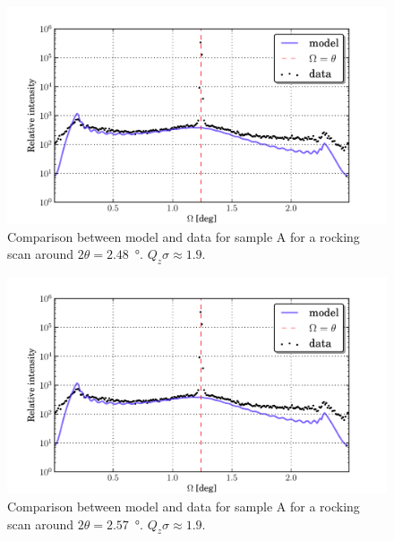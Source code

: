 \documentclass[10pt,twoside, b5paper,pdftex]{report}
\begin{document}
\begin{figure}[htbp]
	\begin{center}
		\includegraphics[width=1.0\textwidth]{figures/74_just_00320.pdf}
	\end{center}
	\caption{Comparison between model and data for  sample A for a rocking scan around $2\theta = 2.48$~\si{\degree}. $Q_z\sigma \approx 1.9$. \label{fig:just_00320}}
\end{figure}
\begin{figure}[htbp]
	\begin{center}
		\includegraphics[width=1.0\textwidth]{figures/74_just_00320.pdf}
	\end{center}
	\caption{Comparison between model and data for  sample A for a rocking scan around $2\theta = 2.57$~\si{\degree}. $Q_z\sigma \approx 1.9$.\label{fig:just_00321}}
\end{figure}
\end{document}

